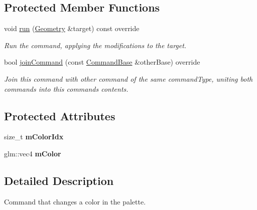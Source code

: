 \subsection*{Protected Member Functions}
\begin{DoxyCompactItemize}
\item 
\mbox{\label{classpepr3d_1_1_cmd_color_manager_change_color_a6a4258a4f2c7c7f4981c566e103e92fd}} 
void \mbox{\hyperlink{classpepr3d_1_1_cmd_color_manager_change_color_a6a4258a4f2c7c7f4981c566e103e92fd}{run}} (\mbox{\hyperlink{classpepr3d_1_1_geometry}{Geometry}} \&target) const override
\begin{DoxyCompactList}\small\item\em Run the command, applying the modifications to the target. \end{DoxyCompactList}\item 
bool \mbox{\hyperlink{classpepr3d_1_1_cmd_color_manager_change_color_a0c77133a022d16d1aa55ba477dade531}{join\+Command}} (const \mbox{\hyperlink{classpepr3d_1_1_command_base}{Command\+Base}} \&other\+Base) override
\begin{DoxyCompactList}\small\item\em Join this command with other command of the same command\+Type, uniting both commands into this command\textquotesingle{}s contents. \end{DoxyCompactList}\end{DoxyCompactItemize}
\subsection*{Protected Attributes}
\begin{DoxyCompactItemize}
\item 
\mbox{\label{classpepr3d_1_1_cmd_color_manager_change_color_afb2945590278744ce010cd5a3185f5d5}} 
size\+\_\+t {\bfseries m\+Color\+Idx}
\item 
\mbox{\label{classpepr3d_1_1_cmd_color_manager_change_color_a155f0360a4c85f7ba025db530c1125a7}} 
glm\+::vec4 {\bfseries m\+Color}
\end{DoxyCompactItemize}


\subsection{Detailed Description}
Command that changes a color in the palette. 


